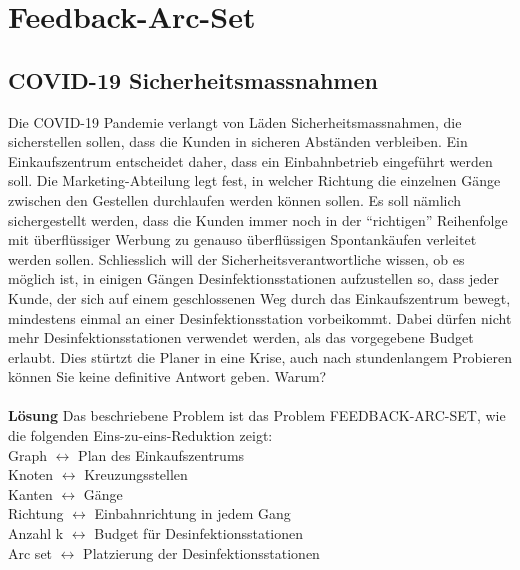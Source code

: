 \section{Feedback-Arc-Set}
\subsection{COVID-19 Sicherheitsmassnahmen}
Die COVID-19 Pandemie verlangt von Läden Sicherheitsmassnahmen, die sicherstellen sollen, dass die Kunden in sicheren Abständen verbleiben. Ein Einkaufszentrum entscheidet daher, dass ein Einbahnbetrieb eingeführt werden soll. Die Marketing-Abteilung legt fest, in welcher Richtung die einzelnen Gänge zwischen den Gestellen durchlaufen werden können sollen. Es soll nämlich sichergestellt werden, dass die Kunden immer noch in der “richtigen” Reihenfolge mit überflüssiger Werbung zu genauso überflüssigen Spontankäufen verleitet werden sollen. Schliesslich will der Sicherheitsverantwortliche wissen, ob es möglich ist, in einigen Gängen Desinfektionsstationen aufzustellen so, dass jeder Kunde, der sich auf einem geschlossenen Weg durch das Einkaufszentrum bewegt, mindestens einmal an einer Desinfektionsstation vorbeikommt. Dabei dürfen nicht mehr Desinfektionsstationen verwendet werden, als das vorgegebene Budget erlaubt. Dies stürtzt die Planer in eine Krise, auch nach stundenlangem Probieren können Sie keine definitive Antwort geben. Warum?\\
\\
\textbf{Lösung}
Das beschriebene Problem ist das Problem FEEDBACK-ARC-SET, wie die folgenden
Eins-zu-eins-Reduktion zeigt:\\
Graph $\leftrightarrow$ Plan des Einkaufszentrums\\
Knoten $\leftrightarrow$ Kreuzungsstellen\\
Kanten $\leftrightarrow$ Gänge\\
Richtung $\leftrightarrow$ Einbahnrichtung in jedem Gang\\
Anzahl k $\leftrightarrow$ Budget für Desinfektionsstationen\\
Arc set $\leftrightarrow$ Platzierung der Desinfektionsstationen